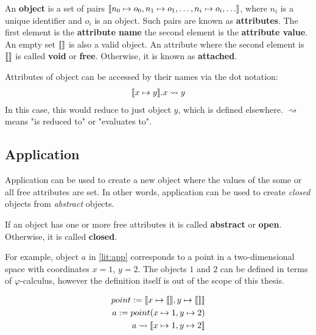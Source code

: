 \begin{definition}
    An \textbf{object} is a set of pairs $\llbracket n_0 \mapsto o_0, n_1 \mapsto o_1, \hdots, n_i \mapsto o_i, \hdots \rrbracket$, where $n_i$ is a unique identifier and $o_i$ is an object. Such pairs are known as \textbf{attributes}. The first element is the \textbf{attribute name} the second element is the \textbf{attribute value}. An empty set $\llbracket  \rrbracket$ is also a valid object. An attribute where the second element is $\llbracket  \rrbracket$ is called \textbf{void} or \textbf{free}. Otherwise, it is known as \textbf{attached}.
\end{definition}

Attributes of object can be accessed by their names via the dot notation:
\begin{align*}
    \llbracket x \mapsto y \rrbracket.x \rightsquigarrow y
\end{align*}
In this case, this would reduce to just object $y$, which is defined elsewhere. $\rightsquigarrow$ means "is reduced to" or "evaluates to".

\subsection{Application}
Application can be used to create a new object where the values of the some or all free attributes are set. In other words, application can be used to create \textit{closed} objects from \textit{abstract} objects.

\begin{definition}
    If an object has one or more free attributes it is called \textbf{abstract} or \textbf{open}. Otherwise, it is called \textbf{closed}.
\end{definition}

For example, object $a$ in \ref{lit:app} corresponds to a point in a two-dimensional space with coordinates $x = 1$, $y = 2$. The objects $1$ and $2$ can be defined in terms of $\varphi$-calculus, however the definition itself is out of the scope of this thesis.

\begin{align}
    point := \llbracket x \mapsto \llbracket  \rrbracket, y \mapsto \llbracket \rrbracket \rrbracket \\
    \label{lit:app}
    a := point(x \mapsto 1, y \mapsto 2)                           \\
    a \rightsquigarrow \llbracket x \mapsto 1, y \mapsto 2 \rrbracket
\end{align}


